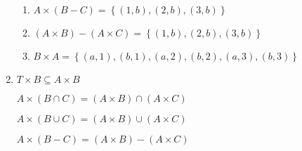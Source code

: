 \begin{enumerate}
\begin{enumerate}
\item $A \times \left( {B - C} \right) = \left\{ {\left( {1, b} \right), \left( {2, b} \right), \left( {3, b} \right)} \right\}$

\item $\left( {A \times B} \right) - \left( {A \times C} \right) = \left\{ {\left( {1, b} \right), \left( {2, b} \right), \left( {3, b} \right)} \right\}$

\item $B \times A = \left\{ {\left( {a,  1} \right), \left( {b, 1} \right), \left( {a, 2} \right), \left( {b, 2} \right), \left( {a, 3} \right), \left( {b, 3} \right)} \right\}$
\end{enumerate}

\item \begin{multicols}{2}
$T \times B \subseteq A \times B$

$A \times \left( {B \cap C} \right) = \left( {A \times B} \right) \cap \left( {A \times C} \right)$

$A \times \left( {B \cup C} \right) = \left( {A \times B} \right) \cup \left( {A \times C} \right)$

$A \times \left( {B - C} \right) = \left( {A \times B} \right) - \left( {A \times C} \right)$
\end{multicols}
\end{enumerate}




